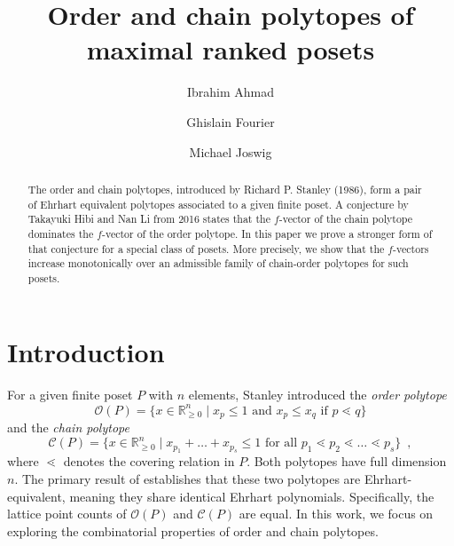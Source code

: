 \documentclass[12pt,a4paper]{amsart}
\renewcommand{\prec}{\lessdot}
\theoremstyle{definition}
\newcommand{\OP}{\mathcal{O}}
\newcommand{\CP}{\mathcal{C}}
\newcommand{\R}{\mathbb{R}}
\begin{document}
\author[Ahmad, Fourier \& Joswig]{Ibrahim Ahmad \and Ghislain Fourier \and Michael Joswig}
\title[Order and chain polytopes of maximal ranked posets]{Order and chain polytopes of \\ maximal ranked posets}

\address{Chair of Algebra and Representation Theory, RWTH Aachen University, Pontdriesch 10-16, 52062 Aachen, Germany}
\address{Technische Universit\"at Berlin, Chair of Discrete Mathematics / Geometry, Berlin, \& MPI Mathematics in the Sciences, Leipzig, Germany} 

\maketitle

\begin{abstract}
  The order and chain polytopes, introduced by Richard P. Stanley (1986), form a pair of Ehrhart equivalent polytopes associated to a given finite poset.
  A conjecture by Takayuki Hibi and Nan Li from 2016 states that the $f$-vector of the chain polytope dominates the $f$-vector of the order polytope. 
  In this paper we prove a stronger form of that conjecture for a special class of posets.
  More precisely, we show that the $f$-vectors increase monotonically over an admissible family of chain-order polytopes for such posets.
\end{abstract}

\section{Introduction} 
For a given finite poset $P$ with $n$ elements, Stanley \cite{Sta86} introduced the \emph{order polytope}
\begin{equation}\label{eq:order-polytope}
  \OP(P) = \{ x \in \R^n_{\geq 0} \mid x_p \leq 1 \text{ and } x_p \leq x_q \text{ if } p \prec q \}
\end{equation}
and the \emph{chain polytope}
\begin{equation}\label{eq:chain-polytope}
  \CP(P) = \{ x \in \R^n_{\geq 0} \mid x_{p_1} + \dots + x_{p_s} \leq 1 \text{ for all } p_1 \prec p_2 \prec \dots \prec p_s\} \enspace ,
\end{equation}
where $\prec$ denotes the covering relation in $P$.
Both polytopes have full dimension $n$.
The primary result of \cite{Sta86} establishes that these two polytopes are Ehrhart-equivalent, meaning they share identical Ehrhart polynomials.
Specifically, the lattice point counts of $\OP(P)$ and $\CP(P)$ are equal.
In this work, we focus on exploring the combinatorial properties of order and chain polytopes.
\end{document}
